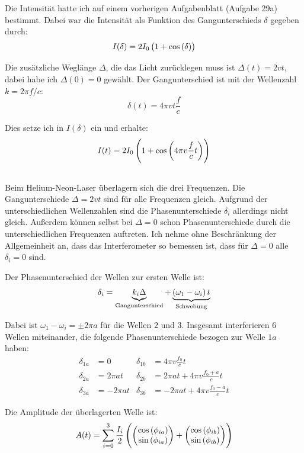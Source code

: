 Die Intensität hatte ich auf einem vorherigen Aufgabenblatt (Aufgabe 29a)
bestimmt. Dabei war die Intensität als Funktion des Gangunterschieds $\delta$
gegeben durch:
\[
	I(\delta) = 2 I_0 \del{1 + \cos\del\delta}
\]

Die zusätzliche Weglänge $\Delta$, die das Licht zurücklegen muss ist
$\Delta(t) = 2 v t$, dabei habe ich $\Delta(0) = 0$ gewählt. Der
Gangunterschied ist mit der Wellenzahl $k = 2 \pi f / c$:
\[
	\delta(t) = 4 \pi v t \frac fc
\]

Dies setze ich in $I(\delta)$ ein und erhalte:
\[
	I(t) = 2 I_0 \del{1 + \cos\del{4 \pi v \frac fc t}}
\]

\subsection{}

Beim Helium-Neon-Laser überlagern sich die drei Frequenzen. Die
Gangunterschiede $\Delta = 2 vt$ sind für alle Frequenzen gleich. Aufgrund der
unterschiedlichen Wellenzahlen sind die Phasenunterschiede $\delta_i$
allerdings nicht gleich. Außerdem können selbst bei $\Delta = 0$ schon
Phasenunterschiede durch die unterschiedlichen Frequenzen auftreten. Ich nehme
ohne Beschränkung der Allgemeinheit an, dass das Interferometer so bemessen
ist, dass für $\Delta = 0$ alle $\delta_i = 0$ sind.

Der Phasenunterschied der Wellen zur ersten Welle ist:
\[
	\delta_i
	= \underbrace{k_i \Delta}_\text{Gangunterschied}
	+ \underbrace{\del{\omega_1 - \omega_i} t}_\text{Schwebung}
\]

Dabei ist $\omega_1 - \omega_i = \pm 2 \pi a$ für die Wellen $2$ und $3$. Insgesamt interferieren $6$ Wellen miteinander, die folgende Phasenunterschiede bezogen zur Welle $1a$ haben:
\begin{align*}
	\delta_{1a} &= 0 & \delta_{1b} &= 4 \pi v \frac{f_0}c t \\
	\delta_{2a} &= 2 \pi a t & \delta_{2b} &= 2 \pi a t + 4 \pi v \frac{f_0+a}c t \\
	\delta_{3a} &= - 2 \pi a t & \delta_{3b} &= - 2 \pi a t + 4 \pi v \frac{f_0-a}c t
\end{align*}

Die Amplitude der überlagerten Welle ist:
\[
	A(t) = \sum_{i = 0}^3 \frac{I_i}2
	\del{
		\begin{pmatrix}
			\cos\del{\phi_{ia}} \\ \sin\del{\phi_{ia}}
		\end{pmatrix}
		+
		\begin{pmatrix}
			\cos\del{\phi_{ib}} \\ \sin\del{\phi_{ib}}
		\end{pmatrix}
	}
\]

